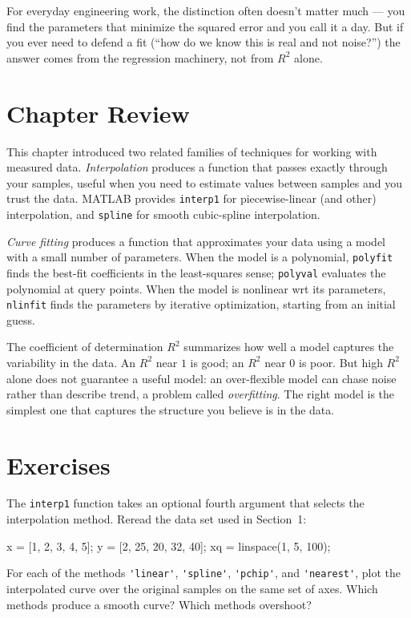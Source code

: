 \documentclass[../../book.tex]{subfiles}
\begin{document}
For everyday engineering work, the distinction often doesn't matter much --- you find the parameters that minimize the squared error and you call it a day.  But if you ever need to defend a fit (``how do we know this is real and not noise?'') the answer comes from the regression machinery, not from $R^2$ alone.

\section{Chapter Review}

This chapter introduced two related families of techniques for working with measured data.  \emph{Interpolation} produces a function that passes exactly through your samples, useful when you need to estimate values between samples and you trust the data.  MATLAB provides \lstinline{interp1} for piecewise-linear (and other) interpolation, and \lstinline{spline} for smooth cubic-spline interpolation.

\emph{Curve fitting} produces a function that approximates your data using a model with a small number of parameters.  When the model is a polynomial, \lstinline{polyfit} finds the best-fit coefficients in the least-squares sense; \lstinline{polyval} evaluates the polynomial at query points.  When the model is nonlinear wrt its parameters, \lstinline{nlinfit} finds the parameters by iterative optimization, starting from an initial guess.

The coefficient of determination $R^2$ summarizes how well a model captures the variability in the data.  An $R^2$ near $1$ is good; an $R^2$ near $0$ is poor.  But high $R^2$ alone does not guarantee a useful model: an over-flexible model can chase noise rather than describe trend, a problem called \emph{overfitting}.  The right model is the simplest one that captures the structure you believe is in the data.

\section{Exercises}

\begin{ex}\label{ex:interp_methods}
The \lstinline{interp1} function takes an optional fourth argument that selects the interpolation method.  Reread the data set used in Section~1:
\begin{code}
x = [1, 2, 3, 4, 5];
y = [2, 25, 20, 32, 40];
xq = linspace(1, 5, 100);
\end{code}
\noindent For each of the methods \lstinline{'linear'}, \lstinline{'spline'}, \lstinline{'pchip'}, and \lstinline{'nearest'}, plot the interpolated curve over the original samples on the same set of axes.  Which methods produce a smooth curve?  Which methods overshoot?
\end{ex}
\end{document}
